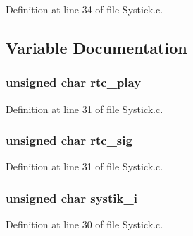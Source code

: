 Definition at line 34 of file Systick.\+c.



\subsection{Variable Documentation}
\subsubsection[{\texorpdfstring{rtc\+\_\+play}{rtc_play}}]{\setlength{\rightskip}{0pt plus 5cm}unsigned char rtc\+\_\+play}\hypertarget{iot-lab___m3_2_systick_8h_ae0a2d8ce5ed66a755934203ebdb666ac}{}\label{iot-lab___m3_2_systick_8h_ae0a2d8ce5ed66a755934203ebdb666ac}


Definition at line 31 of file Systick.\+c.

\subsubsection[{\texorpdfstring{rtc\+\_\+sig}{rtc_sig}}]{\setlength{\rightskip}{0pt plus 5cm}unsigned char rtc\+\_\+sig}\hypertarget{iot-lab___m3_2_systick_8h_add90cbf2f306b02a95fd2d83015f393d}{}\label{iot-lab___m3_2_systick_8h_add90cbf2f306b02a95fd2d83015f393d}


Definition at line 31 of file Systick.\+c.

\subsubsection[{\texorpdfstring{systik\+\_\+i}{systik_i}}]{\setlength{\rightskip}{0pt plus 5cm}unsigned char systik\+\_\+i}\hypertarget{iot-lab___m3_2_systick_8h_a0eab83a5030febd8f48cd5bfa173968b}{}\label{iot-lab___m3_2_systick_8h_a0eab83a5030febd8f48cd5bfa173968b}


Definition at line 30 of file Systick.\+c.

